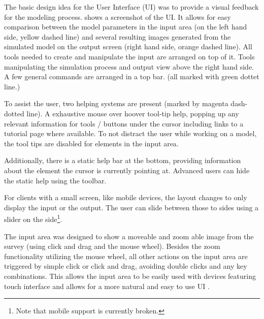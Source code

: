 
The basic design idea for the User Interface (UI) was to provide a visual feedback for the modeling process.
 shows a screenshot of the UI.
It allows for easy comparison between the model parameters in the input area (on the left hand side, yellow dashed line) and several resulting images generated from the simulated model on the output screen (right hand side, orange dashed line).
All tools needed to create and manipulate the input are arranged on top of it.
Tools manipulating the simulation process and output view above the right hand side.
A few general commands are arranged in a top bar. (all marked with green dottet line.)

To assist the user, two helping systems are present (marked by magenta dash-dotted line).
A exhaustive mouse over hoover tool-tip help, popping up any relevant information for tools / buttons under the cursor including links to a tutorial page where available.
To not distract the user while working on a model, the tool tips are disabled for elements in the input area.

Additionally, there is a static help bar at the bottom, providing information about the element the cursor is currently pointing at.
Advanced users can hide the static help using the toolbar.

For clients with a small screen, like mobile devices, the layout changes to only display the input or the output.
The user can slide between those to sides using a slider on the side\footnote{Note that mobile support is currently broken.}.

The input area was designed to show a moveable and zoom able image from the survey (using click and drag and the mouse wheel).
Besides the zoom functionality utilizing the mouse wheel, all other actions on the input area are triggered by simple click or click and drag, avoiding double clicks and any key combinations.
This allows the input area to be easily used with devices featuring touch interface and allows for a more natural and easy to use UI \cite{ui-ms, ui-mac}.

